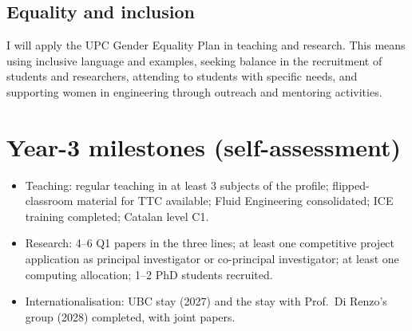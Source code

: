 \documentclass[11pt]{article}
\begin{document}
\subsection{Equality and inclusion}
I will apply the UPC Gender Equality Plan in teaching and research. This means using
inclusive language and examples, seeking balance in the recruitment of students and
researchers, attending to students with specific needs, and supporting women in
engineering through outreach and mentoring activities.

\section{Year-3 milestones (self-assessment)}
\begin{itemize}
\item Teaching: regular teaching in at least 3 subjects of the profile; flipped-classroom
material for TTC available; Fluid Engineering consolidated; ICE training
completed; Catalan level C1.
\item Research: 4--6 Q1 papers in the three lines; at least one competitive project
application as principal investigator or co-principal investigator; at least one
computing allocation; 1--2 PhD students recruited.
\item Internationalisation: UBC stay (2027) and the stay with Prof.\ Di Renzo's group
(2028) completed, with joint papers.
\end{itemize}
\end{document}
